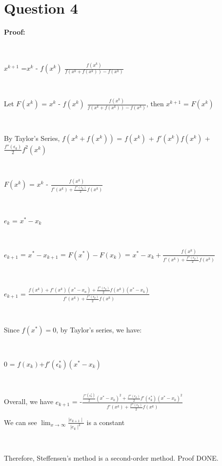\documentclass[11pt]{article} %
\begin{document}
\section{Question 4}
\paragraph{Proof:}\mbox{}\\
\centerline{$x^{k+1}$ =$x^{k}$ - $f(x^{k})$ $\frac{f(x^{k})}{f(x^{k}+f(x^{k}))-f(x^{k})}$}\\\linebreak
\centerline{Let $F(x^{k})$ = $x^{k}$ - $f(x^{k})$ $\frac{f(x^{k})}{f(x^{k}+f(x^{k}))-f(x^{k})}$, then $x^{k+1}$ = $F(x^{k})$}\\\linebreak
\centerline{By Taylor's Series, $f(x^{k}+f(x^{k}))$ = $f(x^{k})$ + $f'(x^{k})f(x^{k})$ + $\frac{f''(\epsilon_{k})}{2}f^{2}(x^{k})$}\\\linebreak\centerline{$F(x^{k})$ = $x^{k}$ - $\frac{f(x^{k})}{f'(x^{k})+\frac{f''(\epsilon_{k})}{2}f(x^{k})}$}\\\linebreak
\centerline{$e_{k}$ = $ x^{*}-x_{k}$}\\\linebreak
\centerline{$e_{k+1}$ = $x^{*}-x_{k+1}$ = $F(x^{*}) - F(x_{k})$ = $x^{*}-x_{k}+\frac{f(x^{k})}{f'(x^{k})+\frac{f''(\epsilon_{k})}{2}f(x^{k})}$ }\\\linebreak
\centerline{$e_{k+1}$ = $\frac{f(x^{k})+f'(x^{k})(x^{*}-x_{n})+\frac{f''(\epsilon_{k})}{2}f(x^{k})(x^{*}-x_{k})}{f'(x^{k})+\frac{f''(\epsilon_{k})}{2}f(x^{k})}$}\\\linebreak
\centerline{Since $f(x^{*}) = 0$, by Taylor's series, we have:}\\\linebreak
\centerline{$0$ = $f(x_{k})$+$f'(\epsilon^{*}_{k})(x^{*}-x_{k})$}\\\linebreak
\centerline{Overall, we have $e_{k+1}$ = -$\frac{\frac{f''(\epsilon^{*}_{k})}{2}(x^{*}-x_{k})^{2}+\frac{f''(\epsilon_{k})}{2}f'(\epsilon^{*}_{k})(x^{*}-x_{k})^{2}}{f'(x^{k})+\frac{f''(\epsilon_{k})}{2}f(x^{k})}$}
\centerline{We can see $\lim_{x\to\infty} \frac{\mid e_{k+1}\mid}{\mid e_{k}\mid^{2}}$ is a constant}\\\linebreak
\centerline{Therefore, Steffensen’s method is a second-order method. Proof DONE.}
\end{document}
